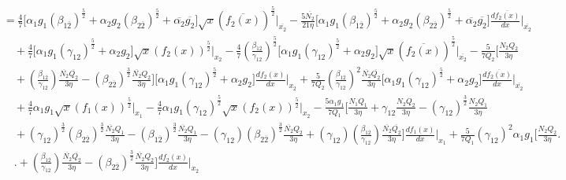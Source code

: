 \documentclass[fleqn, 10pt]{article}
\begin{document}
            \begin{equation*}
            \begin{split}
            &=   \frac{4}{7}\biggl[\alpha_1g_1(\beta_{1\overline{2}})^\frac{5}{2} + \alpha_2 g_2 (\beta_{2\overline{2}})^\frac{5}{2} + \overline{\alpha_2}\overline{g_2}\biggr] \sqrt{x} (\overline{f_2(x)})^\frac{5}{2}\Bigg|_{\overline{x_2}} - \frac{5\overline{N_2}}{21\eta}\biggl[ \alpha_1g_1 (\beta_{1\overline{2}})^\frac{5}{2} + \alpha_2 g_2 (\beta_{2\overline{2}})^\frac{5}{2} +  \overline{\alpha_2}\overline{g_2}\biggr]\frac{d\overline{f_2(x)}}{dx}\Bigg|_{\overline{x_2}} \\ & \quad + \frac{4}{7} \biggl[\alpha_1 g_1(\gamma_{12})^\frac{5}{2}  +   \alpha_2 g_2 \biggr] \sqrt{x} (f_2(x))^\frac{5}{2}\Bigg|_{x_2} - \frac{4}{7}\left(\frac{\beta_{1\overline{2}}}{\gamma_{12}}\right)^\frac{5}{2} \bigl[\alpha_1g_1(\gamma_{12})^\frac{5}{2} +   \alpha_2g_2 \bigr] \sqrt{x} (\overline{f_2(x)})^\frac{5}{2} \Bigg|_{\overline{x_2}}   - \frac{5}{7Q_2} \biggl[\frac{N_2Q_2}{3\eta} \\ & \quad +\left(\frac{\beta_{1\overline{2}}}{\gamma_{12}}\right)\frac{\overline{N_2}\overline{Q_2}}{3\eta}   - (\beta_{2\overline{2}})^\frac{3}{2}\frac{\overline{N_2}Q_2}{3\eta} \biggr] \bigl[\alpha_1 g_1 (\gamma_{12})^\frac{5}{2}  +   \alpha_2 g_2 \bigr] \frac{df_2(x)}{dx}\Bigg|_{x_2} + \frac{5}{7Q_2} \left(\frac{\beta_{1\overline{2}}}{\gamma_{12}}\right)^2 \frac{\overline{N_2}\overline{Q_2}}{3\eta}\bigl[\alpha_1g_1(\gamma_{12})^\frac{5}{2}  +   \alpha_2 g_2 \bigr] \frac{d\overline{f_2(x)}}{dx} \Bigg|_{\overline{x_2}} \\ & \quad +   \frac{4}{7} \alpha_1 g_1 \sqrt{x} (f_1(x))^\frac{5}{2}\Bigg|_{x_1}  -  \frac{4}{7} \alpha_1g_1 (\gamma_{12})^\frac{5}{2}\sqrt{x}(f_2(x))^\frac{5}{2}\Bigg|_{x_2}  - \frac{5\alpha_1 g_1}{7 Q_1} \biggl[\frac{N_1Q_1}{3\eta} 
            + \gamma_{12} \frac{N_2Q_2}{3\eta} - (\gamma_{12})^\frac{3}{2} \frac{N_2Q_1}{3\eta} \\ & \quad + (\gamma_{12})^\frac{3}{2} (\beta_{2\overline{2}})^\frac{3}{2} \frac{\overline{N_2}Q_1}{3\eta} - (\beta_{1\overline{2}})^\frac{3}{2}\frac{\overline{N_2}Q_1}{3\eta}  - (\gamma_{12})(\beta_{2\overline{2}})^\frac{3}{2} \frac{\overline{N_2}Q_2}{3\eta} +  (\gamma_{12})\left(\frac{\beta_{1\overline{2}}}{\gamma_{12}}\right)\frac{\overline{N_2}\overline{Q_2}}{3\eta}\biggr]\frac{df_1(x)}{dx}\Bigg|_{x_1} + \frac{5}{7Q_1}(\gamma_{12})^2 \alpha_{1}g_{1}\biggl[\frac{N_2Q_2}{3\eta} \biggr. \\ & \quad \biggl. + \left(\frac{\beta_{1\overline{2}}}{\gamma_{12}}\right) \frac{\overline{N_2}\overline{Q_2}}{3\eta} -   (\beta_{2\overline{2}})^\frac{3}{2} \frac{\overline{N_2}Q_2}{3\eta}\biggr]\frac{df_2(x)}{dx}\Bigg|_{x_2}
            \end{split}
            \end{equation*}
\end{document}

